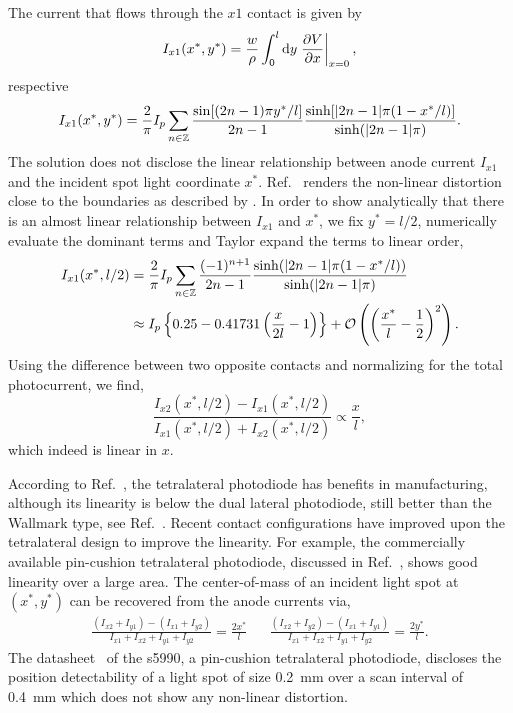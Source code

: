 The current that flows through the $x1$ contact is given by
\begin{equation}
	I_{x1}(x^*,y^*)=\frac{w}{\rho}\int_0^l\dd{y}\eval{\pdv{V}{x}}_{x=0},
\end{equation}
respective
\begin{equation}
	I_{x1}(x^*,y^*)=\frac{2}{\pi}I_p\sum_{n\in\mathbb{Z}}\frac{\sin[(2n-1)\pi y^*/l]}{2n-1}\frac{\sinh[\abs{2n-1}\pi(1-x^*/l)]}{\sinh(\abs{2n-1}\pi)}
	\label{eq:lucovsky_current}.
\end{equation}
The solution does not disclose the linear relationship between anode current $I_{x1}$ and the incident spot light coordinate $x^*$.
Ref.~\cite[Fig.~7]{Woltring75} renders the non-linear distortion close to the boundaries as described by .
In order to show analytically that there is an almost linear relationship between $I_{x1}$ and $x^*$, we fix $y^*=l/2$, numerically evaluate the dominant terms and Taylor expand the terms to linear order,
\begin{align}
	I_{x1}(x^*,l/2)
	&=\frac{2}{\pi}I_p\sum_{n\in\mathbb{Z}}\frac{(-1)^{n+1}}{2n-1}\frac{\sinh(\abs{2n-1}\pi(1-x^*/l))}{\sinh(\abs{2n-1}\pi)}\\
	&\approx I_p\left\{0.25-0.41731\left(\frac{x}{2l}-1\right)\right\}+\mathcal{O}\left(\left(\frac{x^*}{l}-\frac{1}{2}\right)^2\right).
\end{align}
Using the difference between two opposite contacts and normalizing for the total photocurrent, we find,
\begin{equation}
	\frac{I_{x2}(x^*,l/2)-I_{x1}(x^*,l/2)}{I_{x1}(x^*,l/2)+I_{x2}(x^*,l/2)}
	\propto\frac{x}{l},
\end{equation}
which indeed is linear in $x$.

According to Ref.~\cite[p.~41]{Noorlag74}, the tetralateral photodiode has benefits in manufacturing, although its linearity is below the dual lateral photodiode, still better than the Wallmark type, see Ref.~\cite{Woltring75}.
Recent contact configurations have improved upon the tetralateral design to improve the linearity.
For example, the commercially available pin-cushion tetralateral photodiode, discussed in Ref.~\cite{Doke87,Wang89}, shows good linearity over a large area.
The center-of-mass of an incident light spot at $(x^*,y^*)$ can be recovered from the anode currents via,
\begin{align}
	\frac{\left(I_{x2}+I_{y1}\right)-\left(I_{x1}+I_{y2}\right)}{I_{x1}+I_{x2}+I_{y1}+I_{y2}}=\frac{2x^*}{l} &&
	\frac{\left(I_{x2}+I_{y2}\right)-\left(I_{x1}+I_{y1}\right)}{I_{x1}+I_{x2}+I_{y1}+I_{y2}}=\frac{2y^*}{l}	.
\end{align}
The datasheet~\cite{HamamatsuS5990} of the \gls{s5990}, a pin-cushion tetralateral photodiode, discloses the position detectability of a light spot of size \SI{0.2}{\milli\meter} over a scan interval of \SI{0.4}{\milli\meter} which does not show any non-linear distortion.

